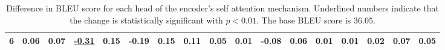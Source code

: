 \begin{table}[t]
\begin{tabular}{c|cccccccccccccccc}
6 & \small\color{NavyBlue} 0.06 & \small\color{NavyBlue} 0.07 & \small\color{Maroon} \underline{\bf -0.31} & \small\color{NavyBlue} 0.15 & \small\color{Maroon} -0.19 & \small\color{NavyBlue} 0.15 & \small\color{NavyBlue} 0.11 & \small\color{NavyBlue} 0.05 & \small\color{NavyBlue} 0.01 & \small\color{Maroon} -0.08 & \small\color{NavyBlue} 0.06 & \small\color{NavyBlue} 0.01 & \small\color{NavyBlue} 0.01 & \small\color{NavyBlue} 0.02 & \small\color{NavyBlue} 0.07 & \small\color{NavyBlue} 0.05 \\
\hline
\end{tabular}
\caption{\label{tab:tfwmt_ablation} Difference in BLEU score for each head of the encoder's self attention mechanism. Underlined numbers indicate that the change is statistically significant with $p<0.01$. The base BLEU score is $36.05$.
}
\end{table}

